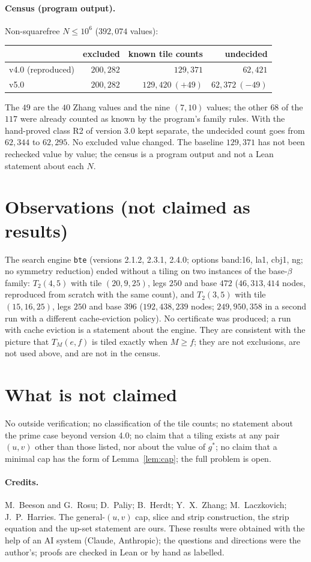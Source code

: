 \documentclass[11pt]{article}
\theoremstyle{remark}
\begin{document}
\paragraph{Census (program output).} Non-squarefree $N\le10^6$ ($392{,}074$ values):
\begin{center}
\begin{tabular}{@{}lrrr@{}}
\toprule
 & excluded & known tile counts & undecided\\
\midrule
v4.0 (reproduced) & $200{,}282$ & $129{,}371$ & $62{,}421$\\
v5.0 & $200{,}282$ & $129{,}420\ (+49)$ & $62{,}372\ (-49)$\\
\bottomrule
\end{tabular}
\end{center}
The $49$ are the $40$ Zhang values and the nine $(7,10)$ values; the other $68$ of the $117$ were already counted as known by the program's family rules. With the hand-proved class R2 of version 3.0 kept separate, the undecided count goes from $62{,}344$ to $62{,}295$. No excluded value changed. The baseline $129{,}371$ has not been rechecked value by value; the census is a program output and not a Lean statement about each $N$.

\section{Observations (not claimed as results)}\label{sec:obs}
The search engine \texttt{bte} (versions 2.1.2, 2.3.1, 2.4.0; options band:16, la1, cbj1, ng; no symmetry reduction) ended without a tiling on two instances of the base-$\beta$ family: $T_2(4,5)$ with tile $(20,9,25)$, legs $250$ and base $472$ ($46{,}313{,}414$ nodes, reproduced from scratch with the same count), and $T_2(3,5)$ with tile $(15,16,25)$, legs $250$ and base $396$ ($192{,}438{,}239$ nodes; $249{,}950{,}358$ in a second run with a different cache-eviction policy). No certificate was produced; a run with cache eviction is a statement about the engine. They are consistent with the picture that $T_M(e,f)$ is tiled exactly when $M\ge f$; they are not exclusions, are not used above, and are not in the census.

\section{What is not claimed}
No outside verification; no classification of the tile counts; no statement about the prime case beyond version 4.0; no claim that a tiling exists at any pair $(u,v)$ other than those listed, nor about the value of $g^*$; no claim that a minimal cap has the form of Lemma~\ref{lem:cap}; the full problem is open.

\paragraph{Credits.} M.~Beeson and G.~Rosu; D.~Paliy; B.~Herdt; Y.~X.~Zhang; M.~Laczkovich; J.~P.~Harries. The general-$(u,v)$ cap, slice and strip construction, the strip equation and the up-set statement are ours. These results were obtained with the help of an AI system (Claude, Anthropic); the questions and directions were the author's; proofs are checked in Lean or by hand as labelled.
\end{document}
